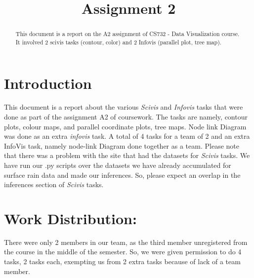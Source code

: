 \documentclass[conference]{IEEEtran}
\begin{document}
\title{Assignment 2\\}


\author{
\and
{}

}

\maketitle

\begin{abstract} This document is a report on the A2 assignment of CS732 - Data Visualization course. It involved 2 scivis tasks (contour, color) and 2 Infovis (parallel plot, tree map).
\end{abstract}


\section{Introduction}
This document is a report about the various \textit{Scivis} and \textit{Infovis} tasks that were done as part of the assignment A2 of coursework. The tasks are namely, contour plots, colour maps, and parallel coordinate plots, tree maps. Node link Diagram was done as an extra \textit{infovis} task. A total of 4 tasks for a team of 2 and an extra InfoVis task, namely node-link Diagram done together as a team.  Please note that there was a problem with the site that had the datasets for \textit{Scivis} tasks. We have run our .py scripts over the datasets we have already accumulated for surface rain data and made our inferences. So, please expect an overlap in the inferences section of \textit{Scivis} tasks.

\section{Work Distribution: }

There were only 2 members in our team, as the third member unregistered from the course in the middle of the semester. So, we were given permission to do 4 tasks, 2 tasks each, exempting us from 2 extra tasks because of lack of a team member. \\
\end{document}
